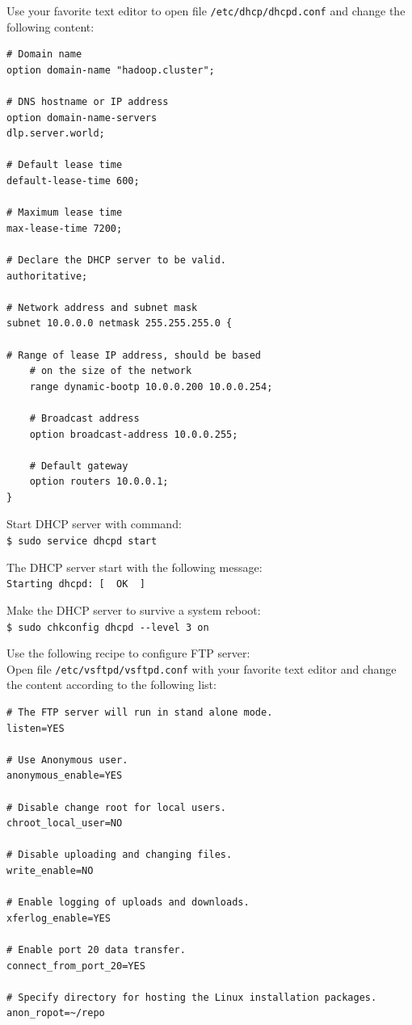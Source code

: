 Use your favorite text editor to open file \verb|/etc/dhcp/dhcpd.conf| and change the following content:
\lstset{style=bashstyle}
\begin{lstlisting}
# Domain name
option domain-name "hadoop.cluster";

# DNS hostname or IP address
option domain-name-servers
dlp.server.world;

# Default lease time
default-lease-time 600;

# Maximum lease time
max-lease-time 7200;

# Declare the DHCP server to be valid.
authoritative;

# Network address and subnet mask
subnet 10.0.0.0 netmask 255.255.255.0 {

# Range of lease IP address, should be based
    # on the size of the network
    range dynamic-bootp 10.0.0.200 10.0.0.254;

    # Broadcast address
    option broadcast-address 10.0.0.255;

    # Default gateway
    option routers 10.0.0.1;
}
\end{lstlisting}

Start DHCP server with command: \\
\verb|$ sudo service dhcpd start|

The DHCP server start with the following message: \\
\verb|Starting dhcpd: [  OK  ]|

Make the DHCP server to survive a system reboot: \\
\verb|$ sudo chkconfig dhcpd --level 3 on|

Use the following recipe to configure FTP server: \\

Open file \verb|/etc/vsftpd/vsftpd.conf| with your favorite text editor and change the content according to the following list:
\lstset{style=bashstyle}
\begin{lstlisting}
# The FTP server will run in stand alone mode.
listen=YES

# Use Anonymous user.
anonymous_enable=YES

# Disable change root for local users.
chroot_local_user=NO

# Disable uploading and changing files.
write_enable=NO

# Enable logging of uploads and downloads.
xferlog_enable=YES

# Enable port 20 data transfer.
connect_from_port_20=YES

# Specify directory for hosting the Linux installation packages.
anon_ropot=~/repo
\end{lstlisting}

